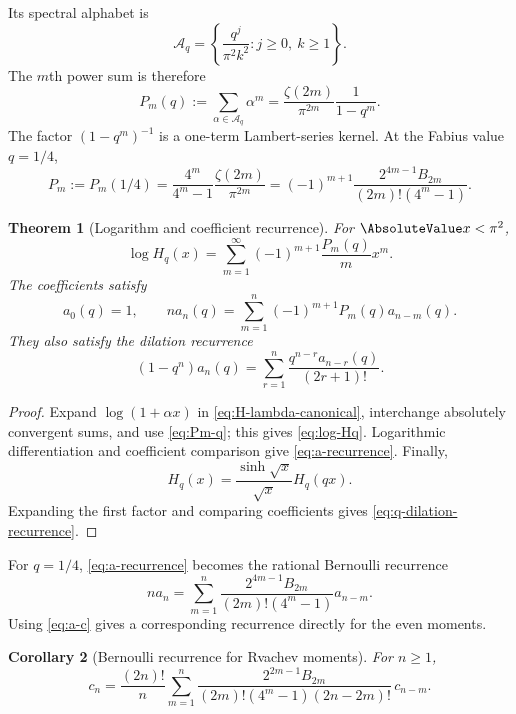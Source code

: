 \documentclass[11pt]{article}
\numberwithin{equation}{section}
\newtheorem{theorem}{Theorem}[section]
\newtheorem{corollary}[theorem]{Corollary}
\theoremstyle{definition}
\theoremstyle{remark}
\begin{document}
Its spectral alphabet is
\begin{equation}\label{eq:Aq}
 \mathcal A_q=\left\{\frac{q^j}{\pi^2k^2}:j\ge0,\ k\ge1\right\}.
\end{equation}
The $m$th power sum is therefore
\begin{equation}\label{eq:Pm-q}
 P_m(q):=\sum_{\alpha\in\mathcal A_q}\alpha^m
 =\frac{\zeta(2m)}{\pi^{2m}}\frac1{1-q^m}.
\end{equation}
The factor $(1-q^m)^{-1}$ is a one-term Lambert-series kernel.  At the Fabius value $q=1/4$,
\begin{equation}\label{eq:Pm-dyadic}
 P_m:=P_m(1/4)
 =\frac{4^m}{4^m-1}\frac{\zeta(2m)}{\pi^{2m}}
 =(-1)^{m+1}\frac{2^{4m-1}B_{2m}}{(2m)!(4^m-1)}.
\end{equation}

\begin{theorem}[Logarithm and coefficient recurrence]\label{thm:recurrence}
For $\AbsoluteValue x<\pi^2$,
\begin{equation}\label{eq:log-Hq}
 \log H_q(x)=\sum_{m=1}^{\infty}(-1)^{m+1}\frac{P_m(q)}m x^m.
\end{equation}
The coefficients satisfy
\begin{equation}\label{eq:a-recurrence}
 a_0(q)=1,\qquad
 n a_n(q)=\sum_{m=1}^{n}(-1)^{m+1}P_m(q)a_{n-m}(q).
\end{equation}
They also satisfy the dilation recurrence
\begin{equation}\label{eq:q-dilation-recurrence}
 (1-q^n)a_n(q)=\sum_{r=1}^{n}\frac{q^{n-r}a_{n-r}(q)}{(2r+1)!}.
\end{equation}
\end{theorem}
\begin{proof}
Expand $\log(1+\alpha x)$ in \eqref{eq:H-lambda-canonical}, interchange absolutely convergent sums, and use \eqref{eq:Pm-q}; this gives \eqref{eq:log-Hq}.  Logarithmic differentiation and coefficient comparison give \eqref{eq:a-recurrence}.  Finally,
\[
 H_q(x)=\frac{\sinh\sqrt{x}}{\sqrt{x}}H_q(qx).
\]
Expanding the first factor and comparing coefficients gives \eqref{eq:q-dilation-recurrence}.
\end{proof}

For $q=1/4$, \eqref{eq:a-recurrence} becomes the rational Bernoulli recurrence
\begin{equation}\label{eq:a-Bernoulli}
 n a_n=\sum_{m=1}^{n}
 \frac{2^{4m-1}B_{2m}}{(2m)!(4^m-1)}a_{n-m}.
\end{equation}
Using \eqref{eq:a-c} gives a corresponding recurrence directly for the even moments.
\begin{corollary}[Bernoulli recurrence for Rvachev moments]\label{cor:c-recurrence}
For $n\ge1$,
\begin{equation}\label{eq:c-Bernoulli}
 c_n=\frac{(2n)!}{n}
 \sum_{m=1}^{n}
 \frac{2^{2m-1}B_{2m}}{(2m)!(4^m-1)(2n-2m)!}\,c_{n-m}.
\end{equation}
\end{corollary}
\end{document}
